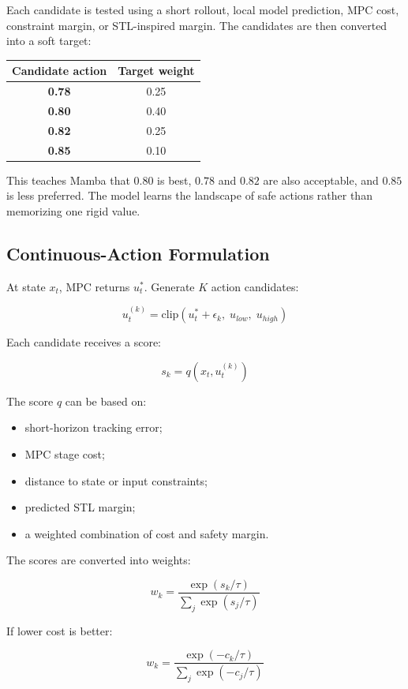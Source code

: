 \documentclass[11pt]{article}
\begin{document}
Each candidate is tested using a short rollout, local model prediction, MPC cost, constraint margin, or STL-inspired margin. The candidates are then converted into a soft target:

\begin{center}
\begin{tabular}{>{\bfseries}c c}
\toprule
Candidate action & Target weight \\
\midrule
0.78 & 0.25 \\
0.80 & 0.40 \\
0.82 & 0.25 \\
0.85 & 0.10 \\
\bottomrule
\end{tabular}
\end{center}

This teaches Mamba that \(0.80\) is best, \(0.78\) and \(0.82\) are also acceptable, and \(0.85\) is less preferred. The model learns the landscape of safe actions rather than memorizing one rigid value.

\subsection{Continuous-Action Formulation}

At state \(x_t\), MPC returns \(u_t^*\). Generate \(K\) action candidates:

\[
u_t^{(k)}
=
\mathrm{clip}(u_t^* + \epsilon_k,\; u_{low},\; u_{high})
\]

Each candidate receives a score:

\[
s_k = q(x_t, u_t^{(k)})
\]

The score \(q\) can be based on:

\begin{itemize}
  \item short-horizon tracking error;
  \item MPC stage cost;
  \item distance to state or input constraints;
  \item predicted STL margin;
  \item a weighted combination of cost and safety margin.
\end{itemize}

The scores are converted into weights:

\[
w_k
=
\frac{\exp(s_k / \tau)}
{\sum_j \exp(s_j / \tau)}
\]

If lower cost is better:

\[
w_k
=
\frac{\exp(-c_k / \tau)}
{\sum_j \exp(-c_j / \tau)}
\]
\end{document}
